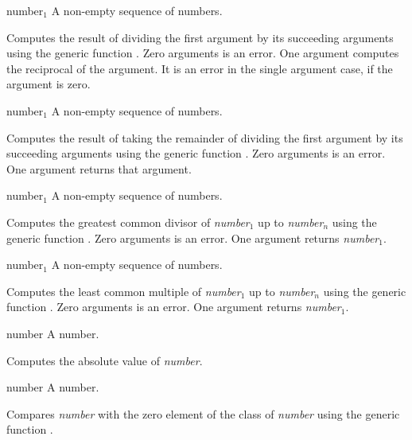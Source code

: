 \begin{optDefinition}
\function{/}
%
\begin{arguments}
    \item[{number$_1$ \optional{number$_2$ ...}}] A non-empty sequence of
    numbers.
\end{arguments}
%
\result%
Computes the result of dividing the first argument by its succeeding arguments
using the generic function .  Zero arguments is an
error.  One argument computes the reciprocal of the argument.  It is an error in
the single argument case, if the argument is zero.

%
\begin{arguments}
    \item[{number$_1$ \optional{number$_2$ ...}}] A non-empty sequence of
    numbers.
\end{arguments}
%
\result%
Computes the result of taking the remainder of dividing the first argument by
its succeeding arguments using the generic function
.  Zero arguments is an error.
One argument returns that argument.

%
\begin{arguments}
    \item[{number$_1$ \optional{number$_2$ ...}}] A non-empty sequence of
    numbers.
\end{arguments}
%
\result%
Computes the greatest common divisor of {\em number$_1$} up to {\em number$_n$}
using the generic function .  Zero arguments is an error.  One
argument returns {\em number$_1$}.

%
\begin{arguments}
    \item[{number$_1$ \optional{number$_2$ ...}}] A non-empty sequence of
    numbers.
\end{arguments}
%
\result%
Computes the least common multiple of {\em number$_1$} up to {\em number$_n$}
using the generic function .  Zero arguments is an error.  One
argument returns {\em number$_1$}.

%
\begin{arguments}
    \item[number] A number.
\end{arguments}
%
\result%
Computes the absolute value of {\em number}.

%
\begin{genericargs}
    \item[number] A number.
\end{genericargs}
%
\result%
Compares {\em number\/} with the zero element of the class of {\em number\/}
using the generic function .


\end{optDefinition}
